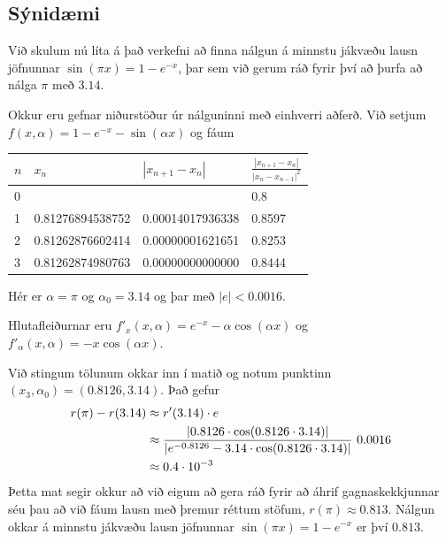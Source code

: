 \documentclass[letterpaper,10pt,icelandic]{sphinxmanual}
\begin{document}
\subsection{Sýnidæmi}
\label{kafli01:id2}
Við skulum nú líta á það verkefni að finna nálgun á minnstu jákvæðu
lausn jöfnunnar \(\sin(\pi x)=1-e^{-x}\), þar sem við gerum ráð
fyrir því að þurfa að nálga \(\pi\) með \(3.14\).

Okkur eru gefnar niðurstöður úr nálguninni með einhverri aðferð. Við
setjum \(f(x,\alpha)=1-e^{-x}-\sin(\alpha x)\) og fáum

\begin{tabulary}{\linewidth}{|L|L|L|L|}
\hline
\textsf{\relax 
\(n\)
} & \textsf{\relax 
\(x_n\)
} & \textsf{\relax 
\(|x_{n+1}-x_n|\)
} & \textsf{\relax 
\(\frac{|x_{n+1}-x_n|}{|x_n-x_{n-1}|^2}\)
}\\
 &  &  & 
0.8
\\
 & 
0.81276894538752
 & 
0.00014017936338
 & 
0.8597
\\
 & 
0.81262876602414
 & 
0.00000001621651
 & 
0.8253
\\
 & 
0.81262874980763
 & 
0.00000000000000
 & 
0.8444
\\
\hline\end{tabulary}


Hér er \(\alpha=\pi\) og \(\alpha_0=3.14\) og þar með
\(|e|<0.0016\).

Hlutafleiðurnar eru \(f'_x(x,\alpha)=e^{-x}-\alpha\cos(\alpha x)\)
og \(f'_\alpha(x,\alpha)=-x\cos(\alpha x)\).

Við stingum tölunum okkar inn í matið og notum punktinn
\((x_3,\alpha_0)=(0.8126,3.14)\). Það gefur
\begin{gather}
\begin{split}\begin{aligned}
    r(\pi)-r(3.14)&\approx r'(3.14) \cdot e\\
    &\approx
    \dfrac{|0.8126\cdot \cos(0.8126\cdot 3.14)|}{|e^{-0.8126}-3.14
    \cdot \cos(0.8126 \cdot 3.14)|}\
    0.0016 \\
    &\approx 0.4\cdot 10^{-3}\end{aligned}\end{split}\notag
\end{gather}
Þetta mat segir okkur að við eigum að gera ráð fyrir að áhrif
gagnaskekkjunnar séu þau að við fáum lausn með þremur réttum stöfum,
\(r(\pi) \approx 0.813\). Nálgun okkar á minnstu jákvæðu lausn
jöfnunnar \(\sin(\pi
x)=1-e^{-x}\) er því \(0.813\).
\end{document}
